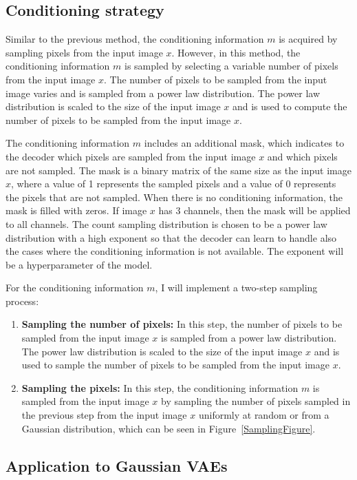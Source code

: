 \subsection{Conditioning strategy}

Similar to the previous method, the conditioning information $m$ is acquired by sampling pixels from the input image $x$. However, in this method, the conditioning information $m$ is sampled by selecting a variable number of pixels from the input image $x$. The number of pixels to be sampled from the input image varies and is sampled from a power law distribution. The power law distribution is scaled to the size of the input image $x$ and is used to compute the number of pixels to be sampled from the input image $x$.

The conditioning information $m$ includes an additional mask, which indicates to the decoder which pixels are sampled from the input image $x$ and which pixels are not sampled. The mask is a binary matrix of the same size as the input image $x$, where a value of 1 represents the sampled pixels and a value of 0 represents the pixels that are not sampled. When there is no conditioning information, the mask is filled with zeros. If image $x$ has 3 channels, then the mask will be applied to all channels. The count sampling distribution is chosen to be a power law distribution with a high exponent so that the decoder can learn to handle also the cases where the conditioning information is not available. The exponent will be a hyperparameter of the model.

For the conditioning information $m$, I will implement a two-step sampling process:

\begin{enumerate}
    \item \textbf{Sampling the number of pixels:} In this step, the number of pixels to be sampled from the input image $x$ is sampled from a power law distribution. The power law distribution is scaled to the size of the input image $x$ and is used to sample the number of pixels to be sampled from the input image $x$.
    \item \textbf{Sampling the pixels:} In this step, the conditioning information $m$ is sampled from the input image $x$ by sampling the number of pixels sampled in the previous step from the input image $x$ uniformly at random or from a Gaussian distribution, which can be seen in Figure~\ref{SamplingFigure}.
\end{enumerate}

\subsection{Application to Gaussian VAEs}

